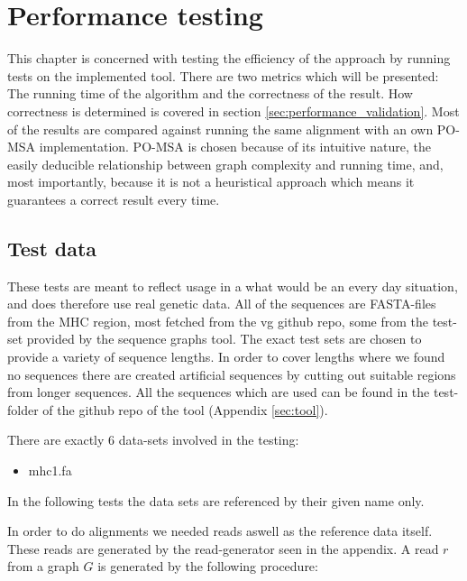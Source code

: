 \documentclass[thesis.tex]{subfiles}
\begin{document}
\chapter{Performance testing}
This chapter is concerned with testing the efficiency of the approach by running tests on the implemented tool. There are two metrics which will be presented: The running time of the algorithm and the correctness of the result. How correctness is determined is covered in section \ref{sec:performance_validation}. Most of the results are compared against running the same alignment with an own PO-MSA implementation. PO-MSA is chosen because of its intuitive nature, the easily deducible relationship between graph complexity and running time, and, most importantly, because it is not a heuristical approach which means it guarantees a correct result every time.
\section{Test data}
These tests are meant to reflect usage in a what would be an every day situation, and does therefore use real genetic data. All of the sequences are FASTA-files from the MHC region, most fetched from the vg github repo\cite{vg}, some from the test-set provided by the sequence graphs tool\cite{sequence_graphs}. The exact test sets are chosen to provide a variety of sequence lengths. In order to cover lengths where we found no sequences there are created artificial sequences by cutting out suitable regions from longer sequences. All the sequences which are used can be found in the test-folder of the github repo of the tool (Appendix \ref{sec:tool}).\\
\par\noindent
There are exactly 6 data-sets involved in the testing:
\begin{itemize}
  \item mhc1.fa
\end{itemize}
In the following tests the data sets are referenced by their given name only.\\
\par\noindent
In order to do alignments we needed reads aswell as the reference data itself. These reads are generated by the read-generator seen in the appendix. A read $r$ from a graph $G$ is generated by the following procedure:
\end{document}
